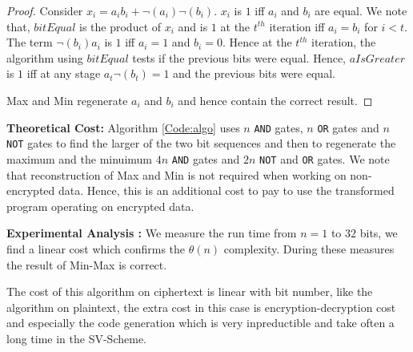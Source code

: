 \documentclass{acm_proc_article-sp}
\begin{document}
\begin{proof}

Consider $x_i = a_ib_i+\neg(a_i)\neg(b_i) $. $x_i$ is $1$ iff $a_i$ and $b_i$ are equal. We note that, $bitEqual$ is the product of $x_i$ and is $1$ at the $t^{th}$ iteration iff $a_i=b_i$ for $i < t$. The term $\neg(b_i)a_i$ is $1$ iff $a_i=1$ and $b_i =0$. Hence at the $t^{th}$ iteration, the algorithm using $bitEqual$ tests if the previous bits were equal. Hence, $aIsGreater$ is $1$ iff at any stage  $a_t\neg(b_t)=1$ and the previous bits were equal.

Max and Min regenerate $a_i$ and $b_i$ and hence contain the correct result.  
\end{proof}
\textbf{Theoretical Cost:} Algorithm \autoref{Code:algo} uses $n$ \texttt{AND} gates, $n$ \texttt{OR} gates and $n$ \texttt{NOT} gates to find the larger of the two bit sequences and then to regenerate the maximum and the minuimum $4n$ \texttt{AND} gates and $2n$ \texttt{NOT} and \texttt{OR} gates. We note that reconstruction of Max and  Min is not required when working on non-encrypted data. Hence, this is an additional cost to pay to use the transformed program operating on encrypted data. 

\textbf{Experimental Analysis :} We measure the run time from $n=1$ to $32$ bits, we find a linear cost which confirms the $\theta(n)$ complexity. During these measures the result of Min-Max is correct.

The cost of this algorithm on ciphertext is linear with bit number, like  the algorithm on plaintext, the extra cost in this case is encryption-decryption cost and especially the code generation which is very inpreductible and take often a long time in the SV-Scheme.
\end{document}
